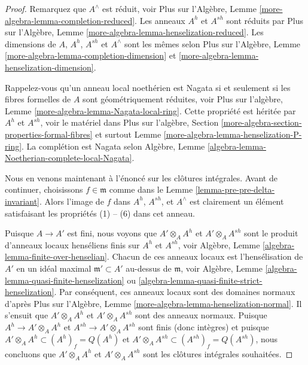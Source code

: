 \begin{proof}
Remarquez que $A^\wedge$ est réduit, voir Plus sur
l'Algèbre, Lemme
\ref{more-algebra-lemma-completion-reduced}. Les anneaux
$A^h$ et $A^{sh}$ sont réduits par Plus sur l'Algèbre, Lemme
\ref{more-algebra-lemma-henselization-reduced}. Les
dimensions de $A$, $A^h$, $A^{sh}$ et $A^\wedge$ sont les mêmes
selon Plus sur l'Algèbre, Lemme
\ref{more-algebra-lemma-completion-dimension} et \ref{more-algebra-lemma-henselization-dimension}.

\medskip\noindent
Rappelez-vous qu'un anneau local noethérien est Nagata si
et seulement si les fibres formelles de $A$ sont
géométriquement réduites, voir Plus sur l'algèbre, Lemme
\ref{more-algebra-lemma-Nagata-local-ring}. Cette propriété
est héritée par $A^h$ et $A^{sh}$, voir le matériel dans
Plus sur l'algèbre, Section
\ref{more-algebra-section-properties-formal-fibres} et surtout Lemme
\ref{more-algebra-lemma-henselization-P-ring}. La complétion est Nagata
selon Algèbre, Lemme \ref{algebra-lemma-Noetherian-complete-local-Nagata}.

\medskip\noindent
Nous en venons maintenant à l’énoncé sur les
clôtures intégrales. Avant de continuer, choisissons
$f \in \mathfrak m$ comme dans le Lemme
\ref{lemma-pre-pre-delta-invariant}. Alors l’image de $f$
dans $A^h$, $A^{sh}$, et $A^\wedge$ est clairement un
élément satisfaisant les propriétés (1) -- (6) dans cet anneau.

\medskip\noindent
Puisque $A \to A'$ est fini, nous voyons que $A' \otimes_A
A^h$ et $A' \otimes_A A^{sh}$ sont le produit d'anneaux
locaux henséliens finis sur $A^h$ et $A^{sh}$, voir Algèbre,
Lemme \ref{algebra-lemma-finite-over-henselian}. Chacun de
ces anneaux locaux est l'hensélisation de $A'$ en un idéal
maximal $\mathfrak m' \subset A'$ au-dessus de $\mathfrak
m$, voir Algèbre, Lemme
\ref{algebra-lemma-quasi-finite-henselization} ou
\ref{algebra-lemma-quasi-finite-strict-henselization}. Par
conséquent, ces anneaux locaux sont des domaines normaux d'après
Plus sur l'Algèbre, Lemme
\ref{more-algebra-lemma-henselization-normal}. Il s'ensuit que $A'
\otimes_A A^h$ et $A' \otimes_A A^{sh}$ sont des anneaux normaux. Puisque
$A^h \to A' \otimes_A A^h$ et $A^{sh} \to A' \otimes_A A^{sh}$ sont finis
(donc intègres) et puisque $A' \otimes_A A^h \subset (A^h)_f = Q(A^h)$ et $A'
\otimes_A A^{sh} \subset (A^{sh})_f = Q(A^{sh})$, nous concluons que $A'
\otimes_A A^h$ et $A' \otimes_A A^{sh}$ sont les clôtures intégrales souhaitées.


\end{proof}
